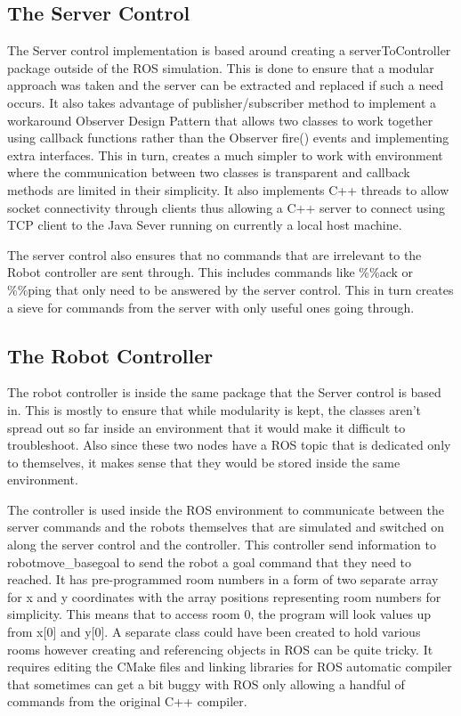 \documentclass{report}
\begin{document}
      \subsection{The Server Control}
        The Server control implementation is based around creating a serverToController package outside of the ROS simulation. This is done to ensure that a modular approach was taken and the server can be extracted and replaced if such a need occurs. It also takes advantage of publisher/subscriber method to implement a workaround Observer Design Pattern that allows two classes to work together using callback functions rather than the Observer fire() events and implementing extra interfaces. This in turn, creates a much simpler to work with environment where the communication between two classes is transparent and callback methods are limited in their simplicity. It also implements C++ threads to allow socket connectivity through clients thus allowing a C++ server to connect using TCP client to the Java Sever running on currently a local host machine.

        The server control also ensures that no commands that are irrelevant to the Robot controller are sent through. This includes commands like \%\%ack or \%\%ping that only need to be answered by the server control. This in turn creates a sieve for commands from the server with only useful ones going through.

      \subsection{The Robot Controller}
        The robot controller is inside the same package that the Server control is based in. This is mostly to ensure that while modularity is kept, the classes aren't spread out so far inside an environment that it would make it difficult to troubleshoot. Also since these two nodes have a ROS topic that is dedicated only to themselves, it makes sense that they would be stored inside the same environment.

        The controller is used inside the ROS environment to communicate between the server commands and the robots themselves that are simulated and switched on along the server control and the controller. This controller send information to robot\/move\_base\/goal to send the robot a goal command that they need to reached. It has pre-programmed room numbers in a form of two separate array for x and y coordinates with the array positions representing room numbers for simplicity. This means that to access room 0, the program will look values up from x[0] and y[0]. A separate class could have been created to hold various rooms however creating and referencing objects in ROS can be quite tricky. It requires editing the CMake files and linking libraries for ROS automatic compiler that sometimes can get a bit buggy with ROS only allowing a handful of commands from the original C++ compiler.
\end{document}
